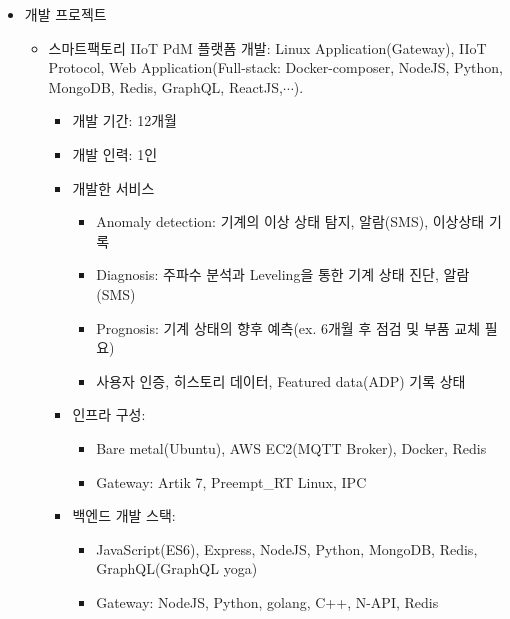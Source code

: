 \divider


\begin{itemize}[label=]
	\item 개발 프로젝트
	      \begin{itemize}[label=]
		      \item 스마트팩토리 IIoT PdM 플랫폼 개발: Linux Application(Gateway), IIoT Protocol, Web Application(Full-stack: Docker-composer, NodeJS, Python, MongoDB, Redis, GraphQL, ReactJS,$\cdots$).\hyperref[pdmplatform]{\space {}}
		            \begin{itemize}[label=]
			            \item 개발 기간: 12개월
			            \item 개발 인력: 1인
			            \item 개발한 서비스
			                  \begin{itemize}
				                  \item Anomaly detection: 기계의 이상 상태 탐지, 알람(SMS), 이상상태 기록
				                  \item Diagnosis: 주파수 분석과 Leveling을 통한 기계 상태 진단, 알람(SMS)
				                  \item Prognosis: 기계 상태의 향후 예측(ex. 6개월 후 점검 및 부품 교체 필요)
				                  \item 사용자 인증, 히스토리 데이터, Featured data(ADP) 기록 상태
			                  \end{itemize}
			            \item 인프라 구성:
			                  \begin{itemize}
				                  \item Bare metal(Ubuntu), AWS EC2(MQTT Broker), Docker, Redis
				                  \item Gateway: Artik 7, Preempt\_RT Linux, IPC
			                  \end{itemize}
			            \item 백엔드 개발 스택:
			                  \begin{itemize}
				                  \item JavaScript(ES6), Express, NodeJS, Python, MongoDB, Redis, GraphQL(GraphQL yoga)
				                  \item Gateway: NodeJS, Python, golang, C++, N-API, Redis
			                  \end{itemize}

\end{itemize}
\end{itemize}
\end{itemize}
